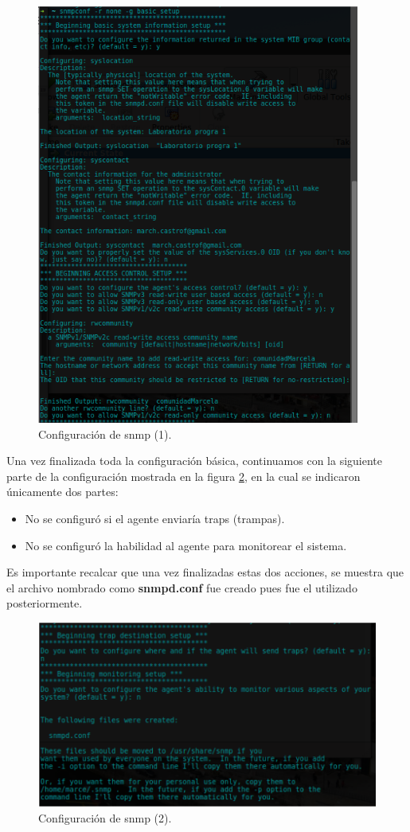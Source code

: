 \begin{figure}[htbp!]
		\centering
			\includegraphics[width=.9 \textwidth]{images/snmpconf1}
		\caption{Configuración de snmp (1).}
		\label{image:snmp1}
\end{figure}
\FloatBarrier

Una vez finalizada toda la configuración básica, continuamos con la siguiente parte de la configuración mostrada en la figura \ref{image:snmp2}, en la cual se indicaron únicamente dos partes:
\begin{itemize}
\item No se configuró si el agente enviaría traps (trampas).
\item No se configuró la habilidad al agente para monitorear el sistema.
\end{itemize}
Es importante recalcar que una vez finalizadas estas dos acciones, se muestra que el archivo nombrado como \textbf{snmpd.conf} fue creado pues fue el utilizado posteriormente.
\FloatBarrier
\begin{figure}[htbp!]
		\centering
			\includegraphics[width=.9 \textwidth]{images/snmpconf2}
		\caption{Configuración de snmp (2).}
		\label{image:snmp2}
\end{figure}
\FloatBarrier

